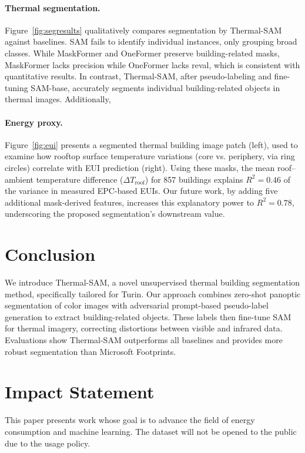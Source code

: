 \documentclass{article}
\theoremstyle{plain}
\theoremstyle{definition}
\theoremstyle{remark}
\begin{document}
\paragraph{Thermal segmentation.} Figure~\ref{fig:segresults} qualitatively compares segmentation by Thermal-SAM against baselines. SAM fails to identify individual instances, only grouping broad classes. While MaskFormer and OneFormer preserve building-related masks, MaskFormer lacks precision while OneFormer lacks reval, which is consistent with quantitative results. In contrast, Thermal-SAM, after pseudo-labeling and fine-tuning SAM-base, accurately segments individual building-related objects in thermal images. Additionally, 

\paragraph{Energy proxy.}
Figure~\ref{fig:eui} presents a segmented thermal building image patch (left), used to examine how rooftop surface temperature variations (core vs. periphery, via ring circles) correlate with EUI prediction (right). Using these masks, the mean roof–ambient temperature difference  ($\Delta T_\text{roof}$) for 857 buildings explains $R^{2}=0.46$ of the variance in measured EPC-based EUIs. Our future work, by adding five additional mask-derived features, increases this explanatory power to $R^{2}=0.78$, underscoring the proposed segmentation's downstream value.
 

\section{Conclusion}

We introduce Thermal-SAM, a novel unsupervised thermal building segmentation method, specifically tailored for Turin. Our approach combines zero-shot panoptic segmentation of color images with adversarial prompt-based pseudo-label generation to extract building-related objects. These labels then fine-tune SAM for thermal imagery, correcting distortions between visible and infrared data. Evaluations show Thermal-SAM outperforms all baselines and provides more robust segmentation than Microsoft Footprints.



\section*{Impact Statement}

This paper presents work whose goal is to advance the field of energy consumption and machine learning. The dataset will not be opened to the public due to the usage policy.
\end{document}
